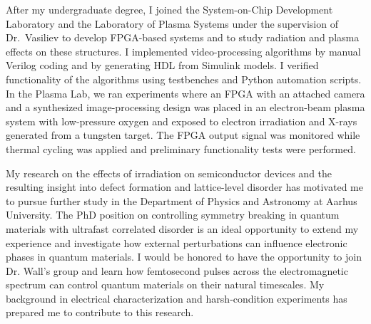 \documentclass[a4paper,12pt]{article}
\begin{document}
\vspace{10pt}
After my undergraduate degree, I joined the System-on-Chip Development Laboratory and the Laboratory of Plasma Systems under the supervision of Dr.\ Vasiliev to develop FPGA-based systems and to study radiation and plasma effects on these structures. I implemented video-processing algorithms by manual Verilog coding and by generating HDL from Simulink models. I verified functionality of the algorithms using testbenches and Python automation scripts. In the Plasma Lab, we ran experiments where an FPGA with an attached camera and a synthesized image-processing design was placed in an electron-beam plasma system with low-pressure oxygen and exposed to electron irradiation and X-rays generated from a tungsten target. The FPGA output signal was monitored while thermal cycling was applied and preliminary functionality tests were performed. 

\vspace{10pt}
My research on the effects of irradiation on semiconductor devices and the resulting insight into defect formation and lattice-level disorder has motivated me to pursue further study in the Department of Physics and Astronomy at Aarhus University. The PhD position on controlling symmetry breaking in quantum materials with ultrafast correlated disorder is an ideal opportunity to extend my experience and investigate how external perturbations can influence electronic phases in quantum materials. I would be honored to have the opportunity to join Dr. Wall’s group and learn how femtosecond pulses across the electromagnetic spectrum can control quantum materials on their natural timescales. My background in electrical characterization and harsh-condition experiments has prepared me to contribute to this research.
\end{document}
